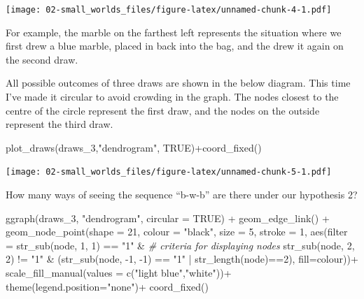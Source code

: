 \documentclass[
]{book}
\newenvironment{Shaded}{\begin{snugshade}}{\end{snugshade}}
\newcommand{\AttributeTok}[1]{\textcolor[rgb]{0.77,0.63,0.00}{#1}}
\newcommand{\CommentTok}[1]{\textcolor[rgb]{0.56,0.35,0.01}{\textit{#1}}}
\newcommand{\ConstantTok}[1]{\textcolor[rgb]{0.00,0.00,0.00}{#1}}
\newcommand{\DecValTok}[1]{\textcolor[rgb]{0.00,0.00,0.81}{#1}}
\newcommand{\FunctionTok}[1]{\textcolor[rgb]{0.00,0.00,0.00}{#1}}
\newcommand{\NormalTok}[1]{#1}
\newcommand{\SpecialCharTok}[1]{\textcolor[rgb]{0.00,0.00,0.00}{#1}}
\newcommand{\StringTok}[1]{\textcolor[rgb]{0.31,0.60,0.02}{#1}}
\begin{document}
\texttt{[image: 02-small\_worlds\_files/figure-latex/unnamed-chunk-4-1.pdf]}

For example, the marble on the farthest left represents the situation where we first drew a blue marble, placed in back into the bag, and the drew it again on the second draw.

All possible outcomes of three draws are shown in the below diagram. This time I've made it circular to avoid crowding in the graph. The nodes closest to the centre of the circle represent the first draw, and the nodes on the outside represent the third draw.

\begin{Shaded}
\begin{Highlighting}[]
\FunctionTok{plot\_draws}\NormalTok{(draws\_3,}\StringTok{"dendrogram"}\NormalTok{, }\ConstantTok{TRUE}\NormalTok{)}\SpecialCharTok{+}\FunctionTok{coord\_fixed}\NormalTok{()}
\end{Highlighting}
\end{Shaded}

\texttt{[image: 02-small\_worlds\_files/figure-latex/unnamed-chunk-5-1.pdf]}

How many ways of seeing the sequence ``b-w-b'' are there under our hypothesis 2?

\begin{Shaded}
\begin{Highlighting}[]
\FunctionTok{ggraph}\NormalTok{(draws\_3, }\StringTok{"dendrogram"}\NormalTok{, }\AttributeTok{circular =} \ConstantTok{TRUE}\NormalTok{) }\SpecialCharTok{+} 
    \FunctionTok{geom\_edge\_link}\NormalTok{() }\SpecialCharTok{+} 
    \FunctionTok{geom\_node\_point}\NormalTok{(}\AttributeTok{shape =} \DecValTok{21}\NormalTok{, }\AttributeTok{colour =} \StringTok{"black"}\NormalTok{, }\AttributeTok{size =} \DecValTok{5}\NormalTok{, }\AttributeTok{stroke =} \DecValTok{1}\NormalTok{,}
                    \FunctionTok{aes}\NormalTok{(}\AttributeTok{filter =} 
                          \FunctionTok{str\_sub}\NormalTok{(node, }\DecValTok{1}\NormalTok{, }\DecValTok{1}\NormalTok{) }\SpecialCharTok{==} \StringTok{"1"} \SpecialCharTok{\&} \CommentTok{\# criteria for displaying nodes}
                          \FunctionTok{str\_sub}\NormalTok{(node, }\DecValTok{2}\NormalTok{, }\DecValTok{2}\NormalTok{) }\SpecialCharTok{!=} \StringTok{"1"} \SpecialCharTok{\&}
\NormalTok{                          (}\FunctionTok{str\_sub}\NormalTok{(node, }\SpecialCharTok{{-}}\DecValTok{1}\NormalTok{, }\SpecialCharTok{{-}}\DecValTok{1}\NormalTok{) }\SpecialCharTok{==} \StringTok{"1"} \SpecialCharTok{|} \FunctionTok{str\_length}\NormalTok{(node)}\SpecialCharTok{==}\DecValTok{2}\NormalTok{), }
                        \AttributeTok{fill=}\NormalTok{colour))}\SpecialCharTok{+}
    \FunctionTok{scale\_fill\_manual}\NormalTok{(}\AttributeTok{values =} \FunctionTok{c}\NormalTok{(}\StringTok{"light blue"}\NormalTok{,}\StringTok{"white"}\NormalTok{))}\SpecialCharTok{+}
    \FunctionTok{theme}\NormalTok{(}\AttributeTok{legend.position=}\StringTok{"none"}\NormalTok{)}\SpecialCharTok{+}
    \FunctionTok{coord\_fixed}\NormalTok{()}
\end{Highlighting}
\end{Shaded}
\end{document}
